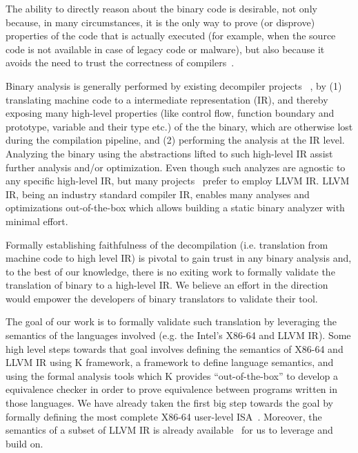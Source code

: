 
The ability to directly reason about the binary code is desirable, not only
because, in many circumstances, it is the only way to prove (or disprove)
  properties of the code that is actually executed (for example, when the
      source code is not available in case of legacy code or malware), but also
  because it avoids the need to trust the correctness of
  compilers~\cite{Thompson,WYSINWYE}.

Binary analysis is generally performed by existing decompiler projects
~\cite{McSema:Recon14,Remill,Angr1,BAP:CAV11,Radare2}, by (1) translating
machine code to a intermediate representation (IR), and thereby exposing many
high-level properties (like control flow, function boundary and prototype,
    variable and their type etc.) of the the binary, which are otherwise lost
during the compilation pipeline, and (2) performing the analysis at the IR
level.  Analyzing the binary using the abstractions lifted to such high-level
IR assist further analysis and/or optimization. Even though such analyzes are
agnostic to any specific high-level IR, but many
projects~\cite{McSema:Recon14,Remill,FCD,reopt,llvm-mctoll} prefer to employ
LLVM IR. LLVM IR, being an industry standard compiler IR, enables many analyses
and optimizations out-of-the-box which allows building a static binary analyzer
with minimal effort.

Formally establishing faithfulness of the decompilation (i.e. translation from
    machine code to high level IR) is pivotal to gain trust in any binary
analysis and, to the best of our knowledge, there is no exiting work to
formally validate the translation of binary to a high-level IR.  We believe an effort in the
direction would empower the developers of binary translators to validate their tool.

The goal of our work is to formally validate such translation by leveraging the
semantics of the languages involved (e.g. the Intel's X86-64 and LLVM IR). Some
high level steps towards that goal involves defining the semantics of X86-64
and LLVM IR using K framework, a framework to define language semantics, and
using the formal analysis tools which K provides ``out-of-the-box'' to develop
a equivalence checker in order to prove equivalence between programs written in
those languages.  We have already taken the first big step towards the goal by
formally defining the most complete X86-64 user-level
ISA~\cite{DasguptaAdve:PLDI19}. Moreover, the semantics of a subset of LLVM IR
is already available~\cite{LLVMSEMA} for us to leverage and build on.

